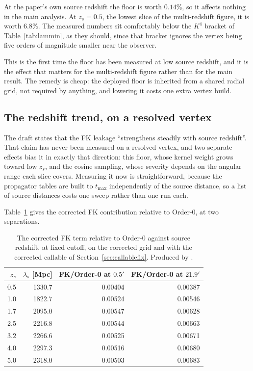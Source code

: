 At the paper's own source redshift the floor is worth $0.14\%$, so it
affects nothing in the main analysis. At $z_s=0.5$, the lowest slice of the
multi-redshift figure, it is worth $6.8\%$. The measured numbers sit
comfortably below the $K^4$ bracket of Table~\ref{tab:lammin}, as they
should, since that bracket ignores the vertex being five orders of
magnitude smaller near the observer.

This is the first time the floor has been measured at low source redshift,
and it is the effect that matters for the multi-redshift figure rather than
for the main result. The remedy is cheap: the deployed floor is inherited
from a shared radial grid, not required by anything, and lowering it costs
one extra vertex build.

\subsection{The redshift trend, on a resolved vertex}

The draft states that the FK leakage ``strengthens steadily with source
redshift''. That claim has never been measured on a resolved vertex, and
two separate effects bias it in exactly that direction: this floor, whose
kernel weight grows toward low $z_s$, and the cosine sampling, whose
severity depends on the angular range each slice covers. Measuring it now
is straightforward, because the propagator tables are built to $t_{\max}$
independently of the source distance, so a list of source distances costs
one sweep rather than one run each.

Table~\ref{tab:ztrend} gives the corrected FK contribution relative to
Order-0, at two separations.

\begin{table}[h]
\centering
\begin{tabular}{rrrr}
\toprule
$z_s$ & $\lambda_s$ [Mpc] & FK/Order-0 at $0.5'$ & FK/Order-0 at $21.9'$ \\
\midrule
0.5 & 1330.7 & 0.00404 & 0.00387 \\
1.0 & 1822.7 & 0.00524 & 0.00546 \\
1.7 & 2095.0 & 0.00547 & 0.00628 \\
2.5 & 2216.8 & 0.00544 & 0.00663 \\
3.2 & 2266.6 & 0.00525 & 0.00671 \\
4.0 & 2297.3 & 0.00516 & 0.00680 \\
5.0 & 2318.0 & 0.00503 & 0.00683 \\
\bottomrule
\end{tabular}
\caption{The corrected FK term relative to Order-0 against source redshift,
at fixed cutoff, on the corrected grid and with the corrected callable of
Section~\ref{sec:callablefix}. Produced by
.}
\label{tab:ztrend}
\end{table}

